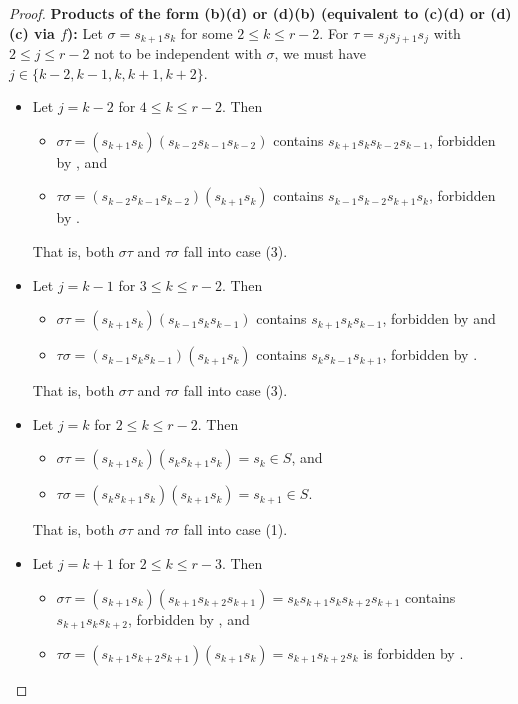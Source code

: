 \documentclass[10pt,a4paper]{amsart}
\begin{document}
\begin{proof}
\noindent \textbf{Products of the form (b)(d) or (d)(b) (equivalent to (c)(d) or (d)(c) via $f$):}
    Let $\sigma=s_{k+1}s_k$ for some $2\leq k\leq r-2$. For $\tau=s_js_{j+1}s_j$ with $2\leq j\leq r-2$ not to be independent with $\sigma$, we must have $j\in\{k-2,k-1,k,k+1,k+2\}$.
    \begin{itemize}
        \item Let $j=k-2$ for $4\leq k\leq r-2$. Then \begin{itemize}
            \item $\sigma\tau=(s_{k+1}s_k)(s_{k-2}s_{k-1}s_{k-2})$ contains $s_{k+1}s_ks_{k-2}s_{k-1}$, forbidden by , and
            \item $\tau\sigma=(s_{k-2}s_{k-1}s_{k-2})(s_{k+1}s_k)$ contains $s_{k-1}s_{k-2}s_{k+1}s_k$, forbidden by .
        \end{itemize}
        That is, both $\sigma\tau$ and $\tau\sigma$ fall into case (3).
        \item Let $j=k-1$ for $3\leq k\leq r-2$. Then \begin{itemize}
            \item $\sigma\tau=(s_{k+1}s_k)(s_{k-1}s_ks_{k-1})$ contains $s_{k+1}s_ks_{k-1}$, forbidden by  and
            \item $\tau\sigma=(s_{k-1}s_ks_{k-1})(s_{k+1}s_k)$ contains $s_ks_{k-1}s_{k+1}$, forbidden by .
        \end{itemize}
        That is, both $\sigma\tau$ and $\tau\sigma$ fall into case (3).
        \item Let $j=k$ for $2\leq k\leq r-2$. Then \begin{itemize}
            \item $\sigma\tau=(s_{k+1}s_k)(s_{k}s_{k+1}s_k)=s_k\in S$, and
            \item $\tau\sigma=(s_{k}s_{k+1}s_k)(s_{k+1}s_k)=s_{k+1}\in S$.
        \end{itemize}
        That is, both $\sigma\tau$ and $\tau\sigma$ fall into case (1).
        \item Let $j=k+1$ for $2\leq k\leq r-3$. Then \begin{itemize}
            \item $\sigma\tau=(s_{k+1}s_k)(s_{k+1}s_{k+2}s_{k+1}) = s_ks_{k+1}s_ks_{k+2}s_{k+1}$ contains $s_{k+1}s_ks_{k+2}$, forbidden by \newline {}, and
            \item $\tau\sigma=(s_{k+1}s_{k+2}s_{k+1})(s_{k+1}s_k) = s_{k+1}s_{k+2}s_k$ is forbidden by .

\end{itemize}
\end{itemize}
\end{proof}
\end{document}
